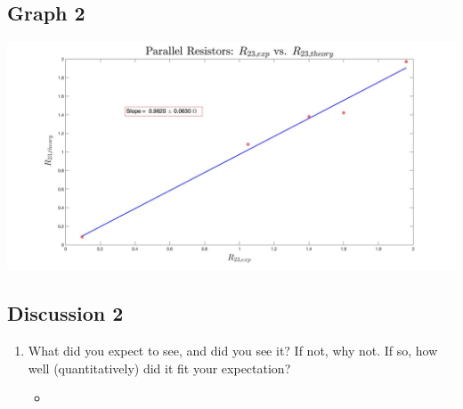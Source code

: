 \documentclass{article}
\begin{document}
\begin{table}[!htp]
\begin{center}
    \subsection*{Graph 2}
    \includegraphics[scale=0.23]{parallel.jpg}
    \subsection*{Discussion 2}
    \begin{enumerate}
      \item What did you expect to see, and did you see it? If not, why not. If so, how well (quantitatively) did it fit your expectation?
      \begin{itemize}
        \item
      \end{itemize}
    \end{enumerate}
  \end{center}
\end{table}
\end{document}
